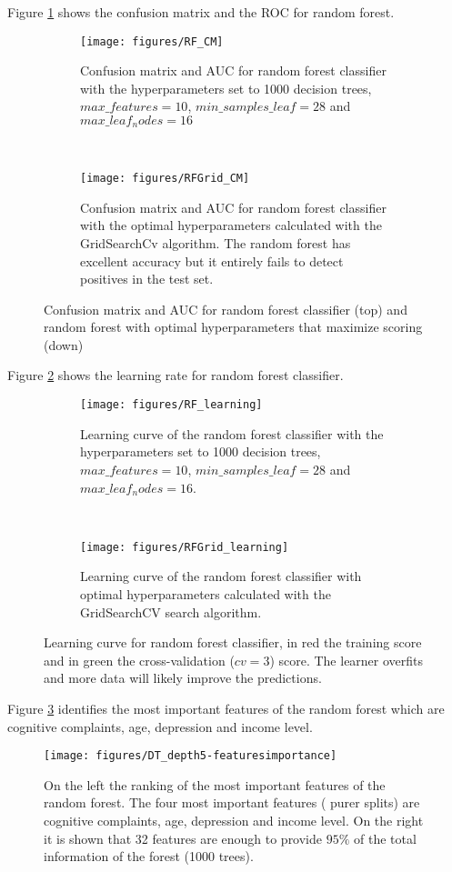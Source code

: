 \documentclass[11pt]{article}
\begin{document}
Figure \ref{fig:rf_cm} shows the confusion matrix and the ROC for random forest. 
\begin{figure}[H]
    \centering
    \begin{subfigure}[t]{.8\textwidth}
        \centering
        \texttt{[image: figures/RF\_CM]}
        \caption{Confusion matrix and AUC for random forest classifier with the hyperparameters set to 1000 decision trees, $max\_features= 10$, $min\_samples\_leaf=28$ and $max\_leaf_nodes=16$}
    \end{subfigure}
    ~ 
    \begin{subfigure}[t]{.8\textwidth}
        \centering
        \texttt{[image: figures/RFGrid\_CM]}
        \caption{Confusion matrix and AUC for random forest classifier with the optimal hyperparameters calculated with the GridSearchCv algorithm. The random forest has excellent accuracy but it entirely fails to detect positives in the test set.}
    \end{subfigure}%
    \label{fig:rf_cm}
    \caption{Confusion matrix and AUC for random forest classifier (top) and random forest with optimal hyperparameters that maximize scoring (down)}
\end{figure}

Figure \ref{fig:rf_learning} shows the learning rate for random forest classifier. 
\begin{figure}[H]
    \centering
    \begin{subfigure}[t]{.8\textwidth}
        \centering
        \texttt{[image: figures/RF\_learning]}
        \caption{Learning curve of the random forest classifier with the hyperparameters set to 1000 decision trees, $max\_features= 10$, $min\_samples\_leaf=28$ and $max\_leaf_nodes=16$.}
    \end{subfigure}
    ~ 
    \begin{subfigure}[t]{.8\textwidth}
        \centering
        \texttt{[image: figures/RFGrid\_learning]}
        \caption{Learning curve of the random forest classifier with optimal hyperparameters calculated with the GridSearchCV search algorithm.}
    \end{subfigure}%
    \label{fig:rf_learning}
    \caption{Learning curve for random forest classifier, in red the training score and in green the cross-validation ($cv=3$) score. The learner overfits and more data will likely improve the predictions.}
\end{figure}

Figure \ref{fig:rf-features} identifies the most important features of the random forest which are cognitive complaints, age, depression and income level.
\begin{figure}[H]
        \centering
        \texttt{[image: figures/DT\_depth5-featuresimportance]}
        \caption{On the left the ranking of the most important features of the random forest. The four most important features ( purer splits) are cognitive complaints, age, depression and income level. On the right it is shown that 32 features are enough to provide $95\%$ of the total information of the forest (1000 trees).   
        }
\label{fig:rf-features}
\end{figure}
\end{document}
